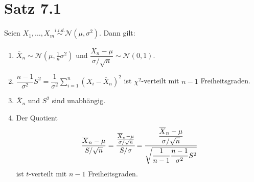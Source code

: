 \documentclass[a4paper,titlepage]{article}
\begin{document}
\section{Satz 7.1}
Seien $X_1, \dots, X_m \overset{i.i.d.}{\sim} \mathcal{N}(\mu, \sigma^2)$. Dann gilt:
\begin{enumerate}
\item $\overline{X}_n \sim \mathcal{N}(\mu,\frac{1}{n}\sigma^2)$ und $\dfrac{\overline{X}_n - \mu}{\sigma / \sqrt{n}} \sim \mathcal{N}(0,1)$.
\item $\dfrac{n-1}{\sigma^2}S^2 = \dfrac{1}{\sigma^2}\displaystyle\sum_{i=1}^{n}(X_i - \overline{X}_n)^2$ ist $\chi^2$-verteilt mit $n-1$ Freiheitsgraden.
\item $\overline{X}_n$ und $S^2$ sind unabhängig.
\item Der Quotient
\begin{equation*}
\frac{\overline{X}_n - \mu}{S/\sqrt{n}} = \cfrac{\frac{\overline{X}_n - \mu}{\sigma / \sqrt{n}}}{S/ \sigma} = \cfrac{\dfrac{\overline{X}_n - \mu}{\sigma / \sqrt{n}}}{\sqrt{\dfrac{1}{n-1}\dfrac{n-1}{\sigma^2}S^2}}
\end{equation*}
ist $t$-verteilt mit $n-1$ Freiheitsgraden.
\end{enumerate}
\end{document}
